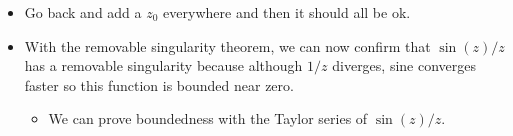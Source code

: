 \documentclass[../notes.tex]{subfiles}
\begin{document}
\begin{itemize}
\begin{proof}
        Case 1: If $\triangle\not\ni z$, then we can draw a star-shaped domain surrounding the triangle on which $f$ will be holomorphic and invoke the CIT to imply that the integral is zero.\par
        Case 2: If $\triangle\ni z$, then $\int F\dd{z}$ is arbitrarily small. Recall that we get this by using homotopy to replace the integral over the triangle with the integral over some tiny $\gamma_\varepsilon$. Arbitrarily small because $f$ is bounded.\par
        Morera then tells us that $F\in\mathcal{O}(U)$, so $F'=f\in\mathcal{O}(U)$. Note that $F'=f$ because
        \begin{equation*}
            F'(z) = \lim_{\zeta\to z}\frac{F(\zeta)-F(z)}{\zeta-z}
            = \lim_{\zeta\to z}\frac{f(\zeta)(\zeta-z)-0}{\zeta-z}
            = \lim_{\zeta\to z}f(\zeta)
            = f(z)
        \end{equation*}
    \end{proof}
    \item Go back and add a $z_0$ everywhere and then it should all be ok.
    \item With the removable singularity theorem, we can now confirm that $\sin(z)/z$ has a removable singularity because although $1/z$ diverges, sine converges faster so this function is bounded near zero.
    \begin{itemize}
        \item We can prove boundedness with the Taylor series of $\sin(z)/z$.
    \end{itemize}
\end{itemize}
\end{document}
